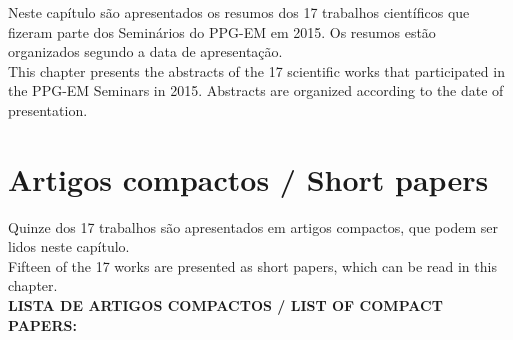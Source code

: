 \documentclass[11pt,a4paper]{book} %
\newcommand{\Numpaperspt}{Quinze }
\newcommand{\Numpapersen}{Fifteen }
\begin{document}
Neste capítulo são apresentados os resumos dos 17 trabalhos científicos
que fizeram parte dos Seminários do PPG-EM em 2015. Os resumos estão
organizados segundo a data de apresentação.\\

This chapter presents the abstracts of the 17 scientific works that
participated in the PPG-EM Seminars in 2015. Abstracts are organized
according to the date of presentation.\\





















\chapter{Artigos compactos / Short papers}

\hspace{-8mm}
\Numpaperspt dos 17 trabalhos são apresentados em artigos compactos, que podem ser lidos neste capítulo.\\

\hspace{-8mm}
\Numpapersen of the 17 works are presented as short papers, which can be read in this chapter.\\

\hspace{-8mm}
\textbf{LISTA DE ARTIGOS COMPACTOS / LIST OF COMPACT PAPERS:}\\
\end{document}
